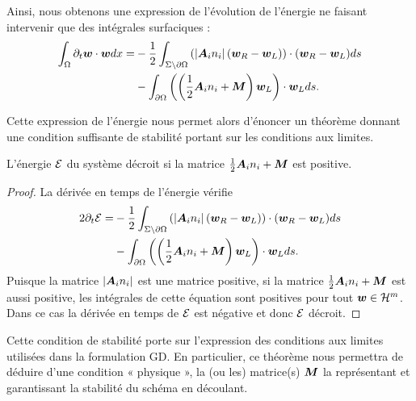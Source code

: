 Ainsi, nous obtenons une expression de l’évolution de l’énergie ne faisant
intervenir que des intégrales surfaciques :
\begin{equation}
	\begin{aligned}
		\int_{\Omega} \partial_{t} \bm{w} \cdot \bm{w} dx =
		&- \frac{1}{2} \int_{\Sigma \setminus \partial\Omega}
			\left( \left\vert{\bm{A}_{i}n_{i}}\right\vert (\bm{w}_R - \bm{w}_L) \right)
			\cdot (\bm{w}_R - \bm{w}_L) ds \\
		&- \int_{\partial\Omega}
			\left( \left( \frac{1}{2} {\bm{A}_{i}n_{i}} + \bm{M} \right) \bm{w}_L \right)
			\cdot \bm{w}_L ds .
	\end{aligned}
\end{equation}


Cette expression de l’énergie nous permet alors d’énoncer un théorème donnant
une condition suffisante de stabilité portant sur les conditions aux limites.
\begin{theorem} \label{thm:decroissance_energie}
	L'énergie $\mathcal{E}$ du système décroit si la matrice
	$\frac{1}{2} {\bm{A}_{i}n_{i}} + \bm{M}$ est positive.
\end{theorem}

\begin{proof}
	La dérivée en temps de l’énergie vérifie
	\begin{equation}
		\begin{aligned}
			2 \partial_{t} \mathcal{E} =
			&- \frac{1}{2} \int_{\Sigma \setminus \partial\Omega}
				\left( \left\vert{\bm{A}_{i}n_{i}}\right\vert (\bm{w}_R - \bm{w}_L) \right)
				\cdot (\bm{w}_R - \bm{w}_L) ds \\
			&- \int_{\partial\Omega}
				\left( \left( \frac{1}{2} {\bm{A}_{i}n_{i}} + \bm{M} \right) \bm{w}_L \right)
				\cdot \bm{w}_L ds .
		\end{aligned}
	\end{equation}
	Puisque la matrice $\left\vert{\bm{A}_{i}n_{i}}\right\vert$ est une matrice positive, si la matrice
	$\frac{1}{2} {\bm{A}_{i}n_{i}} + \bm{M}$ est aussi positive, les intégrales de cette équation sont
	positives pour tout $\bm{w} \in \mathcal{H}^m$.
	Dans ce cas la dérivée en temps de $\mathcal{E}$ est négative et donc $\mathcal{E}$ décroit.
\end{proof}

\begin{remark}
	Cette condition de stabilité porte sur l’expression des conditions aux limites
	utilisées dans la formulation GD. En particulier, ce théorème nous permettra
	de déduire d’une condition « physique », la (ou les) matrice(s) $\bm{M}$ la représentant
	et garantissant la stabilité du schéma en découlant.
\end{remark}


